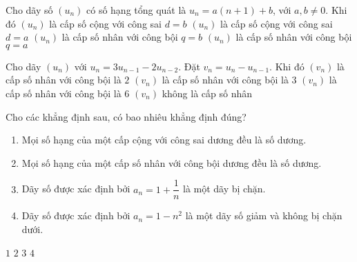 \begin{ex}%
	Cho dãy số $(u_n)$ có số hạng tổng quát là $u_n=a(n+1)+b$, với $a,b \ne 0$. Khi đó
	\choice
	{$(u_n)$ là cấp số cộng với công sai $d=b$}
	{\True $(u_n)$ là cấp số cộng với công sai $d=a$}
	{$(u_n)$ là cấp số nhân với công bội $q=b$}
	{$(u_n)$ là cấp số nhân với công bội $q=a$}
\end{ex}

\begin{ex}%
	Cho dãy $(u_n)$ với $u_n=3u_{n-1}-2u_{n-2}$. Đặt $v_n=u_n-u_{n-1}$. Khi đó
	\choice
	{\True $(v_n)$ là cấp số nhân với công bội là $2$}
	{$(v_n)$ là cấp số nhân với công bội là $3$}
	{$(v_n)$ là cấp số nhân với công bội là $6$}
	{$(v_n)$ không là cấp số nhân}
\end{ex}

\begin{ex}%
	Cho các khẳng định sau, có bao nhiêu khẳng định đúng?
	\begin{enumerate}[\hspace*{1cm}(I)]
		\item Mọi số hạng của một cấp cộng với công sai dương đều là số dương.
		\item Mọi số hạng của một cấp số nhân với công bội dương đều là số dương.
		\item Dãy số được xác định bởi $a_n=1+\dfrac{1}{n}$ là một dãy bị chặn.
		\item Dãy số được xác định bởi $a_n=1-n^2$ là một dãy số giảm và không bị chặn dưới.
	\end{enumerate}
	
	\choice
	{$1$}
	{\True $2$}
	{$3$}
	{$4$}
\end{ex}

